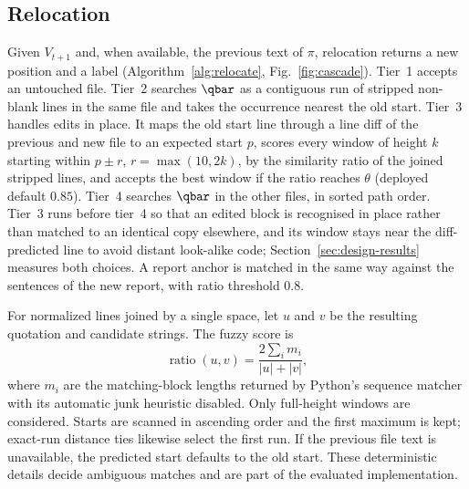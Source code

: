 \subsection{Relocation}
Given $V_{t+1}$ and, when available, the previous text of $\pi$, relocation returns a new position and a label (Algorithm~\ref{alg:relocate}, Fig.~\ref{fig:cascade}). Tier~1 accepts an untouched file. Tier~2 searches $\qbar$ as a contiguous run of stripped non-blank lines in the same file and takes the occurrence nearest the old start. Tier~3 handles edits in place. It maps the old start line through a line diff \cite{pythonsequence} of the previous and new file to an expected start $p$, scores every window of height $k$ starting within $p \pm r$, $r = \max(10, 2k)$, by the similarity ratio of the joined stripped lines, and accepts the best window if the ratio reaches $\theta$ (deployed default $0.85$). Tier~4 searches $\qbar$ in the other files, in sorted path order. Tier~3 runs before tier~4 so that an edited block is recognised in place rather than matched to an identical copy elsewhere, and its window stays near the diff-predicted line to avoid distant look-alike code; Section~\ref{sec:design-results} measures both choices. A report anchor is matched in the same way against the sentences of the new report, with ratio threshold 0.8.

For normalized lines joined by a single space, let $u$ and $v$ be the resulting quotation and candidate strings. The fuzzy score is
\begin{equation}
\operatorname{ratio}(u,v)=\frac{2\sum_i m_i}{|u|+|v|},
\end{equation}
where $m_i$ are the matching-block lengths returned by Python's sequence matcher with its automatic junk heuristic disabled. Only full-height windows are considered. Starts are scanned in ascending order and the first maximum is kept; exact-run distance ties likewise select the first run. If the previous file text is unavailable, the predicted start defaults to the old start. These deterministic details decide ambiguous matches and are part of the evaluated implementation.

